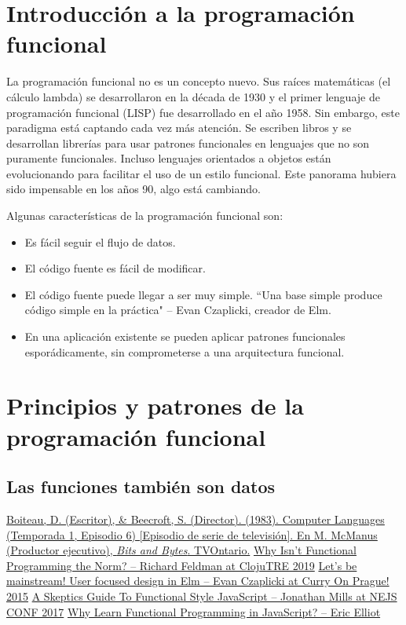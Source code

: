\documentclass{article}
\begin{document}
\section{Introducción a la programación funcional}
\label{sec:fp-intro}
La programación funcional no es un concepto nuevo. Sus raíces matemáticas (el cálculo lambda) se desarrollaron en la década de 1930 y el primer lenguaje de programación funcional (LISP) fue desarrollado en el año 1958. Sin embargo, este paradigma está captando cada vez más atención. Se escriben libros y se desarrollan librerías para usar patrones funcionales en lenguajes que no son puramente funcionales. Incluso lenguajes orientados a objetos están evolucionando para facilitar el uso de un estilo funcional. Este panorama hubiera sido impensable en los años 90, algo está cambiando.\cite{why-isnt-fp-norm}

Algunas características de la programación funcional son:
\begin{itemize}
  \item Es fácil seguir el flujo de datos.
  \item El código fuente es fácil de modificar.
  \item El código fuente puede llegar a ser muy simple. ``Una base simple produce código simple en la práctica" \medspace – Evan Czaplicki, creador de Elm.\cite{mainstream-elm}
  \item En una aplicación existente se pueden aplicar patrones funcionales esporádicamente, sin comprometerse a una arquitectura funcional.\cite{skeptics-functional-style}
\end{itemize}


\section{Principios y patrones de la programación funcional}


\subsection{Las funciones también son datos}


\pagebreak
\begin{thebibliography}{99}
   \href{https://youtu.be/_C5AHaS1mOA}{Boiteau, D. (Escritor), \& Beecroft, S. (Director). (1983). Computer Languages (Temporada 1, Episodio 6) [Episodio de serie de televisión]. En M. McManus (Productor ejecutivo), \textit{Bits and Bytes}. TVOntario.}
   \href{https://youtu.be/QyJZzq0v7Z4}{Why Isn't Functional Programming the Norm? – Richard Feldman at ClojuTRE 2019}
   \href{https://youtu.be/oYk8CKH7OhE?t=2133}{Let's be mainstream! User focused design in Elm – Evan Czaplicki at Curry On Prague! 2015}
   \href{https://youtu.be/oF9XTJoScOE?t=1253}{A Skeptics Guide To Functional Style JavaScript – Jonathan Mills at NEJS CONF 2017}
   \href{https://medium.com/javascript-scene/why-learn-functional-programming-in-javascript-composing-software-ea13afc7a257}{Why Learn Functional Programming in JavaScript? – Eric Elliot}
\end{thebibliography}
\end{document}
